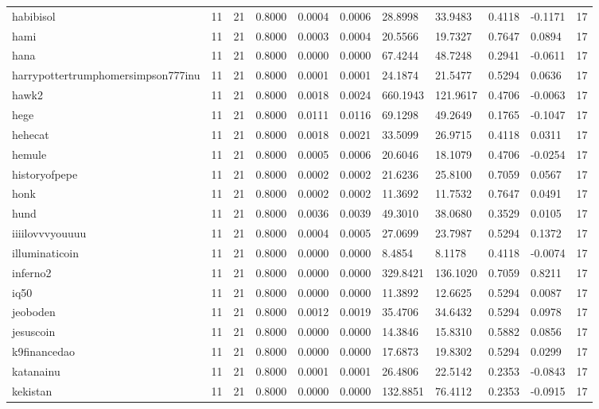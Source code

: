 \begin{table}[htbp]
\begin{tabular}{lllllllllll}
habibisol & 11 & 21 & 0.8000 & 0.0004 & 0.0006 & 28.8998 & 33.9483 & 0.4118 & -0.1171 & 17 \\
hami & 11 & 21 & 0.8000 & 0.0003 & 0.0004 & 20.5566 & 19.7327 & 0.7647 & 0.0894 & 17 \\
hana & 11 & 21 & 0.8000 & 0.0000 & 0.0000 & 67.4244 & 48.7248 & 0.2941 & -0.0611 & 17 \\
harrypottertrumphomersimpson777inu & 11 & 21 & 0.8000 & 0.0001 & 0.0001 & 24.1874 & 21.5477 & 0.5294 & 0.0636 & 17 \\
hawk2 & 11 & 21 & 0.8000 & 0.0018 & 0.0024 & 660.1943 & 121.9617 & 0.4706 & -0.0063 & 17 \\
hege & 11 & 21 & 0.8000 & 0.0111 & 0.0116 & 69.1298 & 49.2649 & 0.1765 & -0.1047 & 17 \\
hehecat & 11 & 21 & 0.8000 & 0.0018 & 0.0021 & 33.5099 & 26.9715 & 0.4118 & 0.0311 & 17 \\
hemule & 11 & 21 & 0.8000 & 0.0005 & 0.0006 & 20.6046 & 18.1079 & 0.4706 & -0.0254 & 17 \\
historyofpepe & 11 & 21 & 0.8000 & 0.0002 & 0.0002 & 21.6236 & 25.8100 & 0.7059 & 0.0567 & 17 \\
honk & 11 & 21 & 0.8000 & 0.0002 & 0.0002 & 11.3692 & 11.7532 & 0.7647 & 0.0491 & 17 \\
hund & 11 & 21 & 0.8000 & 0.0036 & 0.0039 & 49.3010 & 38.0680 & 0.3529 & 0.0105 & 17 \\
iiiilovvvyouuuu & 11 & 21 & 0.8000 & 0.0004 & 0.0005 & 27.0699 & 23.7987 & 0.5294 & 0.1372 & 17 \\
illuminaticoin & 11 & 21 & 0.8000 & 0.0000 & 0.0000 & 8.4854 & 8.1178 & 0.4118 & -0.0074 & 17 \\
inferno2 & 11 & 21 & 0.8000 & 0.0000 & 0.0000 & 329.8421 & 136.1020 & 0.7059 & 0.8211 & 17 \\
iq50 & 11 & 21 & 0.8000 & 0.0000 & 0.0000 & 11.3892 & 12.6625 & 0.5294 & 0.0087 & 17 \\
jeoboden & 11 & 21 & 0.8000 & 0.0012 & 0.0019 & 35.4706 & 34.6432 & 0.5294 & 0.0978 & 17 \\
jesuscoin & 11 & 21 & 0.8000 & 0.0000 & 0.0000 & 14.3846 & 15.8310 & 0.5882 & 0.0856 & 17 \\
k9financedao & 11 & 21 & 0.8000 & 0.0000 & 0.0000 & 17.6873 & 19.8302 & 0.5294 & 0.0299 & 17 \\
katanainu & 11 & 21 & 0.8000 & 0.0001 & 0.0001 & 26.4806 & 22.5142 & 0.2353 & -0.0843 & 17 \\
kekistan & 11 & 21 & 0.8000 & 0.0000 & 0.0000 & 132.8851 & 76.4112 & 0.2353 & -0.0915 & 17 \\

\end{tabular}
\end{table}
